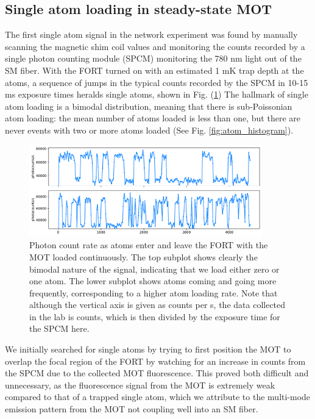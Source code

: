 
\subsection{Single atom loading in steady-state MOT}

The first single atom signal in the network experiment was found by manually scanning the magnetic shim coil values and monitoring the counts recorded by a single photon counting module (SPCM) monitoring the 780 nm light out of the SM fiber. With the FORT turned on with an estimated 1 mK trap depth at the atoms, a sequence of jumps in the typical counts recorded by the SPCM in 10-15 ms exposure times heralds single atoms, shown in Fig. (\ref{fig:atoms_loaded_steady_state}) The hallmark of single atom loading is a bimodal distribution, meaning that there is sub-Poissonian atom loading: the mean number of atoms loaded is less than one, but there are never events with two or more atoms loaded (See Fig. \ref{fig:atom_histogram}).
\begin{figure}[!ht]
    \centering
    \includegraphics[width=0.9\textwidth]{Images/2024-06-21_atom_loading_with_continuous_MOT_time_series_loading_comparison_aspect0.02.pdf}
    \caption{Photon count rate as atoms enter and leave the FORT with the MOT loaded continuously. The top subplot shows clearly the bimodal nature of the signal, indicating that we load either zero or one atom. The lower subplot shows atoms coming and going more frequently, corresponding to a higher atom loading rate. Note that although the vertical axis is given
    as counts per s, the data collected in the lab is counts, 
    which is then divided by the exposure time for the SPCM here.}
    \label{fig:atoms_loaded_steady_state}
\end{figure}
We initially searched for single atoms by trying to first position the MOT to overlap the focal region of the FORT by watching for an increase in counts from the SPCM due to the collected MOT fluorescence. This proved both difficult and unnecessary, as the fluorescence signal from the MOT is extremely weak compared to that of a trapped single atom, which we attribute to the multi-mode emission pattern from the MOT not coupling well into an SM fiber. 

